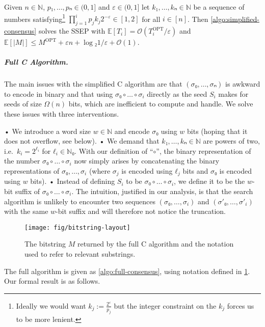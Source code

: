 \documentclass[cleveref,thm-restate]{lipics-v2021}
\def\OPT{\mathrm{OPT}}
\def\consensus{\texorpdfstring{C\scalebox{0.8}{ONSENSUS}}{CONSENSUS}\xspace}
\begin{document}
\begin{theorem}[Performance of Simplified \consensus]
    \label{thm:simplified-consensus}
    Given $n ∈ ℕ$, $p₁,…,pₙ ∈ (0,1]$ and $ε ∈ (0,1]$ let $k₁,…,kₙ ∈ ℕ$ be a sequence of numbers satisfying\footnote{Ideally we would want $k_j := \frac{2^ε}{p_j}$ but the integer constraint on the $k_j$ forces us to be more lenient.}
    $\prod_{j = 1}^{i} p_j k_j 2^{-ε} ∈ [1,2]$ for all $i ∈ [n]$.
    Then \cref{algo:simplified-consensus} solves the SSEP with $𝔼[T_i] = 𝒪(T_i^\OPT / ε)$ and $𝔼[|M|] ≤ M^\OPT+εn+\log₂ 1/ε + 𝒪(1)$.
\end{theorem}

\subparagraph{Full \consensus Algorithm.}
The main issues with the simplified \consensus algorithm are that $(σ₀,…,σₙ)$ is awkward to encode in binary and that using $σ₀∘…∘σ_i$ directly as the seed $S_i$ makes for seeds of size $Ω(n)$ bits, which are inefficient to compute and handle. We solve these issues with three interventions.
\begin{enumerate}
    • We introduce a word size $w ∈ ℕ$ and encode $σ₀$ using $w$ bits (hoping that it does not overflow, see below).
    • We demand that $k₁,…,kₙ ∈ ℕ$ are powers of two, i.e.\ $k_i = 2^{ℓ_i}$ for $ℓ_i ∈ ℕ₀$. With our definition of “$∘$”, the binary representation of the number $σ₀∘…∘σ_i$ now simply arises by concatenating the binary representations of $σ₀,…,σ_i$ (where $σ_j$ is encoded using $ℓ_j$ bits and $σ₀$ is encoded using $w$ bits).
    • Instead of defining $S_i$ to be $σ₀∘…∘σ_i$, we define it to be the $w$-bit suffix of $σ₀∘…∘σ_i$.
    The intuition, justified in our analysis, is that the search algorithm is unlikely to encounter two sequences $(σ₀,…,σ_i)$ and $(σ'₀,…,σ'_i)$ with the same $w$-bit suffix and will therefore not notice the truncation.
\end{enumerate}

\begin{figure}[tb]
    \centering
    \texttt{[image: fig/bitstring-layout]}
    \caption{The bitstring $M$ returned by the full \consensus algorithm and the notation used to refer to relevant substrings.}
    \label{fig:full-consensus-notation}
\end{figure}

The full algorithm is given as \cref{algo:full-consensus}, using notation defined in \cref{fig:full-consensus-notation}.
Our formal result is as follows.
\end{document}
